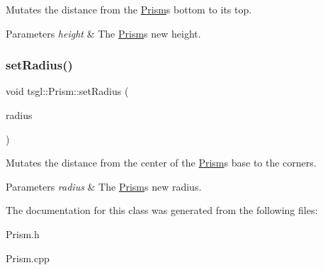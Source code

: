 Mutates the distance from the \hyperlink{classtsgl_1_1_prism}{Prism}\textquotesingle{}s bottom to its top. 


\begin{DoxyParams}{Parameters}
{\em height} & The \hyperlink{classtsgl_1_1_prism}{Prism}\textquotesingle{}s new height. \\
\hline
\end{DoxyParams}
\mbox{\label{classtsgl_1_1_prism_afab75920c51c0104d20f78534fac3656}} 
\subsubsection{\texorpdfstring{set\+Radius()}{setRadius()}}
{\footnotesize\ttfamily void tsgl\+::\+Prism\+::set\+Radius (\begin{DoxyParamCaption}\item[{G\+Lfloat}]{radius }\end{DoxyParamCaption})\hspace{0.3cm}{\ttfamily [virtual]}}



Mutates the distance from the center of the \hyperlink{classtsgl_1_1_prism}{Prism}\textquotesingle{}s base to the corners. 


\begin{DoxyParams}{Parameters}
{\em radius} & The \hyperlink{classtsgl_1_1_prism}{Prism}\textquotesingle{}s new radius. \\
\hline
\end{DoxyParams}


The documentation for this class was generated from the following files\+:\begin{DoxyCompactItemize}
\item 
Prism.\+h\item 
Prism.\+cpp\end{DoxyCompactItemize}
